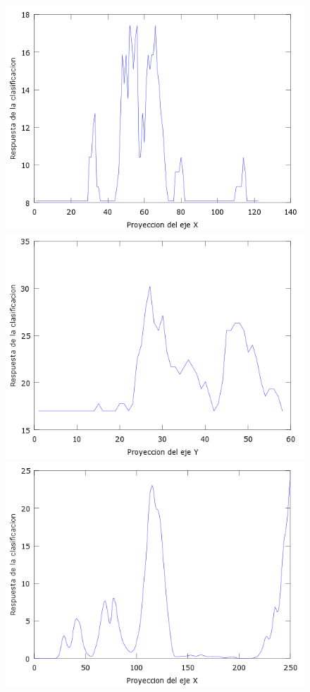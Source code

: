 \begin{figure}[htc]
  \centering
  \includegraphics[scale=.4]{images/plots/boost3X}
  \includegraphics[scale=.4]{images/plots/boost3Y}
  \includegraphics[scale=.4]{images/plots/svm2X}

\end{figure}
